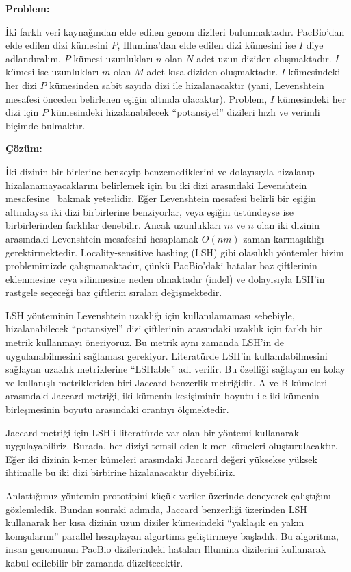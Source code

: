 \documentclass[11pt]{article}
\begin{document}
{\bf Problem:}

İki farklı veri kaynağından elde edilen genom dizileri bulunmaktadır. PacBio'dan elde edilen dizi kümesini $P$, Illumina'dan elde edilen dizi kümesini ise $I$ diye adlandıralım. $P$ kümesi uzunlukları $n$ olan $N$ adet uzun diziden oluşmaktadır. $I$ kümesi ise uzunlukları $m$ olan $M$ adet kısa diziden oluşmaktadır. $I$ kümesindeki her dizi $P$ kümesinden sabit sayıda dizi ile hizalanacaktır (yani, Levenshtein mesafesi önceden belirlenen eşiğin altında olacaktır). Problem, $I$ kümesindeki her dizi için $P$ kümesindeki hizalanabilecek ``potansiyel'' dizileri hızlı ve verimli biçimde bulmaktır.

{\bf {\underline{Çözüm:}}}

İki dizinin bir-birlerine benzeyip benzemediklerini ve dolayısıyla hizalanıp hizalanamayacaklarını belirlemek için bu iki dizi arasındaki Levenshtein mesafesine~\cite{Levenshtein1966} bakmak yeterlidir. Eğer Levenshtein mesafesi belirli bir eşiğin altındaysa iki dizi birbirlerine benziyorlar, veya eşiğin üstündeyse ise birbirlerinden farklılar denebilir. Ancak uzunlukları $m$ ve $n$ olan iki dizinin arasındaki Levenshtein mesafesini hesaplamak $O(nm)$ zaman karmaşıklığı gerektirmektedir. Locality-sensitive hashing (LSH) gibi olasılıklı yöntemler bizim problemimizde çalışmamaktadır,  çünkü PacBio'daki hatalar baz çiftlerinin eklenmesine veya silinmesine neden olmaktadır (indel) ve dolayısıyla LSH'in rastgele seçeceği baz çiftlerin sıraları değişmektedir.


LSH yönteminin Levenshtein uzaklığı için kullanılamaması sebebiyle, hizalanabilecek ``potansiyel'' dizi çiftlerinin arasındaki uzaklık için farklı bir metrik kullanmayı öneriyoruz. Bu metrik aynı zamanda LSH'in de uygulanabilmesini sağlaması gerekiyor. Literatürde LSH'in kullanılabilmesini sağlayan uzaklık metriklerine ``LSHable'' adı verilir. Bu özelliği sağlayan en kolay ve kullanışlı metrikleriden biri Jaccard benzerlik metriğidir. A ve B kümeleri arasındaki Jaccard metriği, iki kümenin kesişiminin boyutu ile iki kümenin birleşmesinin boyutu arasındaki orantıyı ölçmektedir.


Jaccard metriği için LSH'i literatürde var olan bir yöntemi \cite{Broder1998} kullanarak uygulayabiliriz. Burada, her diziyi temsil eden k-mer kümeleri oluşturulacaktır. Eğer iki dizinin k-mer kümeleri arasındaki Jaccard değeri yüksekse yüksek ihtimalle bu iki dizi birbirine hizalanacaktır diyebiliriz.

Anlattığımız yöntemin prototipini küçük veriler üzerinde deneyerek çalıştığını gözlemledik. Bundan sonraki adımda, Jaccard benzerliği üzerinden LSH kullanarak her kısa dizinin uzun diziler kümesindeki ``yaklaşık en yakın komşularını'' parallel hesaplayan algortima geliştirmeye başladık. Bu algoritma, insan genomunun PacBio dizilerindeki hataları Illumina dizilerini kullanarak kabul edilebilir bir zamanda düzeltecektir.
\end{document}

